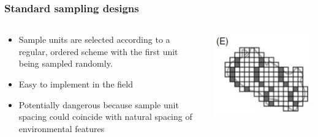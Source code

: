 \documentclass[color=usenames,dvipsnames]{beamer}\usepackage[]{graphicx}\usepackage[]{xcolor}
\begin{document}
\begin{frame}
  \frametitle{Standard sampling designs}
  \large
  {\centering \bf \Large \color{RoyalBlue}{Systematic sampling} \par}
  \vfill
  \begin{columns}
    \large
    \begin{column}{0.6\textwidth}
      \begin{itemize}[<+->]
        \item Sample units are selected according to a regular,
          ordered scheme with the first unit being sampled randomly.
        \item Easy to implement in the field
        \item Potentially dangerous because sample unit spacing could
          coincide with natural spacing of environmental features
      \end{itemize}
    \end{column}
    \begin{column}{0.4\textwidth}
      \includegraphics[width=\textwidth]{figs/designE}
    \end{column}
  \end{columns}
\end{frame}






\end{document}
